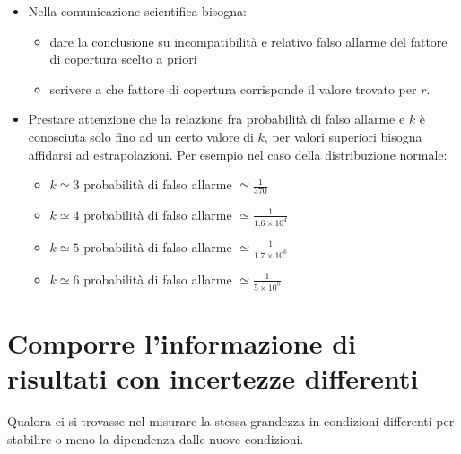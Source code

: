 \documentclass[11pt,a4paper]{book}
\begin{document}
\begin{itemize}
\item Nella comunicazione scientifica bisogna:
\begin{itemize}
\item dare la conclusione su incompatibilità e relativo falso allarme del fattore di copertura scelto a priori
\item scrivere a che fattore di copertura corrisponde il valore trovato per $ r $.
\end{itemize}
\item Prestare attenzione che la relazione fra probabilità di falso allarme e $ k $ è conosciuta solo fino ad un certo valore di $ k $, per valori superiori bisogna affidarsi ad estrapolazioni. Per esempio nel caso della distribuzione normale:
\begin{itemize} 
\item $ k \simeq 3 $ probabilità di falso allarme $ \simeq \frac{1}{370} $
\item $ k \simeq 4 $ probabilità di falso allarme $ \simeq \frac{1}{1.6\times 10^4} $
\item $ k \simeq 5 $ probabilità di falso allarme $ \simeq \frac{1}{1.7 \times 10^6} $
\item $ k \simeq 6 $ probabilità di falso allarme $ \simeq \frac{1}{5 \times 10^8} $
\end{itemize}
\end{itemize}
\section[Informazione da incertezze differenti]{Comporre l'informazione di risultati con incertezze differenti}
Qualora ci si trovasse nel misurare la stessa grandezza in condizioni differenti per stabilire o meno la dipendenza dalle nuove condizioni. 
\end{document}
